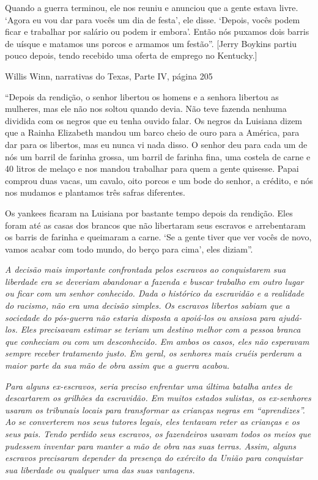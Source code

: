 Quando a guerra terminou, ele nos reuniu e anunciou que a gente estava
livre. `Agora eu vou dar para vocês um dia de festa', ele disse.
`Depois, vocês podem ficar e trabalhar por salário ou podem ir embora'.
Então nós puxamos dois barris de uísque e matamos uns porcos e armamos
um festão''. {[}Jerry Boykins partiu pouco depois, tendo recebido uma
oferta de emprego no Kentucky.{]}

Willis Winn, narrativas do Texas, Parte IV, página 205

``Depois da rendição, o senhor libertou os homens e a senhora libertou
as mulheres, mas ele não nos soltou quando devia. Não teve fazenda
nenhuma dividida com os negros que eu tenha ouvido falar. Os negros da
Luisiana dizem que a Rainha Elizabeth mandou um barco cheio de ouro para
a América, para dar para os libertos, mas eu nunca vi nada disso. O
senhor deu para cada um de nós um barril de farinha grossa, um barril de
farinha fina, uma costela de carne e 40 litros de melaço e nos mandou
trabalhar para quem a gente quisesse. Papai comprou duas vacas, um
cavalo, oito porcos e um bode do senhor, a crédito, e nós nos mudamos e
plantamos três safras diferentes.

Os yankees ficaram na Luisiana por bastante tempo depois da rendição.
Eles foram até as casas dos brancos que não libertaram seus escravos e
arrebentaram os barris de farinha e queimaram a carne. `Se a gente tiver
que ver vocês de novo, vamos acabar com todo mundo, do berço para cima',
eles diziam''.

\emph{A decisão mais importante confrontada pelos escravos ao
conquistarem sua liberdade era se deveriam abandonar a fazenda e buscar
trabalho em outro lugar ou ficar com um senhor conhecido. Dada o
histórico da escravidão e a realidade do racismo, não era uma decisão
simples. Os escravos libertos sabiam que a sociedade do pós-guerra não
estaria disposta a apoiá-los ou ansiosa para ajudá-los. Eles precisavam
estimar se teriam um destino melhor com a pessoa branca que conheciam ou
com um desconhecido. Em ambos os casos, eles não esperavam sempre
receber tratamento justo. Em geral, os senhores mais cruéis perderam a
maior parte da sua mão de obra assim que a guerra acabou.}

\emph{Para alguns ex-escravos, seria preciso enfrentar uma última
batalha antes de descartarem os grilhões da escravidão. Em muitos
estados sulistas, os ex-senhores usaram os tribunais locais para
transformar as crianças negras em ``aprendizes''. Ao se converterem nos
seus tutores legais, eles tentavam reter as crianças e os seus pais.
Tendo perdido seus escravos, os fazendeiros usavam todos os meios que
pudessem inventar para manter a mão de obra nas suas terras. Assim,
alguns escravos precisaram depender da presença do exército da União
para conquistar sua liberdade ou qualquer uma das suas vantagens.}

